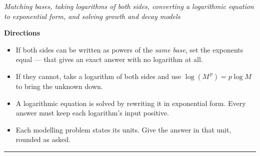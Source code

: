 \documentclass[12pt]{article}
\begin{document}

\begin{center}
\textit{Matching bases, taking logarithms of both sides, converting a logarithmic equation to exponential form, and solving growth and decay models}
\end{center}

\noindent\textbf{Directions}
\begin{itemize}[leftmargin=1.1cm, itemsep=1pt, topsep=3pt]
  \item If both sides can be written as powers of the \emph{same base}, set the exponents equal --- that gives an exact answer with no logarithm at all.
  \item If they cannot, take a logarithm of both sides and use $\log(M^{\,p}) = p\log M$ to bring the unknown down.
  \item A logarithmic equation is solved by rewriting it in exponential form. Every answer must keep each logarithm's input positive.
  \item Each modelling problem states its units. Give the answer in that unit, rounded as asked.
\end{itemize}

\vspace{0.2cm}
\noindent\rule{\linewidth}{0.4pt}







\end{document}
